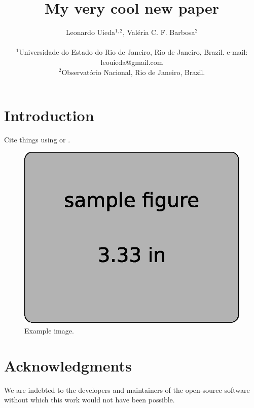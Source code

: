 \documentclass[twocolumn]{article}
\begin{document}
\title{
    My very cool new paper
}
\author{
    Leonardo Uieda$^{1,2}$,
    Valéria C. F. Barbosa$^{2}$
    \\\\
    {\small
        $^1$Universidade do Estado do Rio de Janeiro, Rio de Janeiro, Brazil.
        e-mail: leouieda@gmail.com
    }
    \\
    {\small
        $^2$Observatório Nacional, Rio de Janeiro, Brazil.
    }
}


\maketitle


\begin{abstract}
    \lipsum[1]
\end{abstract}


\section{Introduction}

Cite things using \citet{tikhonov1977} or \citep{tikhonov1977}.

\begin{figure}
    \centering
    \includegraphics[]{figures/example}
    \caption{
        Example image.
    }
    \label{fig:meh}
\end{figure}


\section{Acknowledgments}

We are indebted to the developers and maintainers of the open-source
software without which this work would not have been possible.




\end{document}

